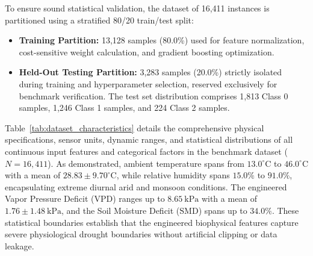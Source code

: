 To ensure sound statistical validation, the dataset of 16,411 instances is partitioned using a stratified 80/20 train/test split:
\begin{itemize}
    \item \textbf{Training Partition:} 13,128 samples (80.0\%) used for feature normalization, cost-sensitive weight calculation, and gradient boosting optimization.
    \item \textbf{Held-Out Testing Partition:} 3,283 samples (20.0\%) strictly isolated during training and hyperparameter selection, reserved exclusively for benchmark verification. The test set distribution comprises 1,813 Class 0 samples, 1,246 Class 1 samples, and 224 Class 2 samples.
\end{itemize}

Table~\ref{tab:dataset_characteristics} details the comprehensive physical specifications, sensor units, dynamic ranges, and statistical distributions of all continuous input features and categorical factors in the benchmark dataset ($N = 16,411$). As demonstrated, ambient temperature spans from $13.0^{\circ}\text{C}$ to $46.0^{\circ}\text{C}$ with a mean of $28.83 \pm 9.70^{\circ}\text{C}$, while relative humidity spans $15.0\%$ to $91.0\%$, encapsulating extreme diurnal arid and monsoon conditions. The engineered Vapor Pressure Deficit ($\text{VPD}$) ranges up to $8.65\ \text{kPa}$ with a mean of $1.76 \pm 1.48\ \text{kPa}$, and the Soil Moisture Deficit ($\text{SMD}$) spans up to $34.0\%$. These statistical boundaries establish that the engineered biophysical features capture severe physiological drought boundaries without artificial clipping or data leakage.

